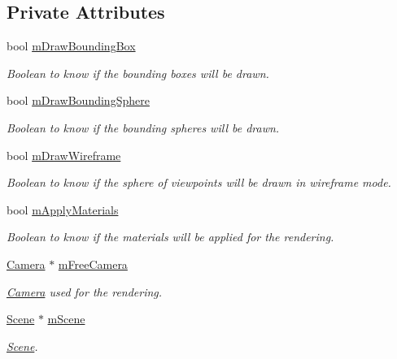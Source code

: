 \subsection*{Private Attributes}
\begin{DoxyCompactItemize}
\item 
bool \hyperlink{class_g_l_canvas_a29134dbb47d2929ec22466af3ff82fc6}{m\+Draw\+Bounding\+Box}
\begin{DoxyCompactList}\small\item\em Boolean to know if the bounding boxes will be drawn. \end{DoxyCompactList}\item 
bool \hyperlink{class_g_l_canvas_a8c5d1ccfff6a1d1d3d578b1f20414292}{m\+Draw\+Bounding\+Sphere}
\begin{DoxyCompactList}\small\item\em Boolean to know if the bounding spheres will be drawn. \end{DoxyCompactList}\item 
bool \hyperlink{class_g_l_canvas_adb8c8071a5e78417ff56355466992ca1}{m\+Draw\+Wireframe}
\begin{DoxyCompactList}\small\item\em Boolean to know if the sphere of viewpoints will be drawn in wireframe mode. \end{DoxyCompactList}\item 
bool \hyperlink{class_g_l_canvas_afee59d3997ff8cb4e05fb5a1244d5278}{m\+Apply\+Materials}
\begin{DoxyCompactList}\small\item\em Boolean to know if the materials will be applied for the rendering. \end{DoxyCompactList}\item 
\hyperlink{class_camera}{Camera} $\ast$ \hyperlink{class_g_l_canvas_a819693fdcfb9caccfa7b368edc3613c6}{m\+Free\+Camera}
\begin{DoxyCompactList}\small\item\em \hyperlink{class_camera}{Camera} used for the rendering. \end{DoxyCompactList}\item 
\hyperlink{class_scene}{Scene} $\ast$ \hyperlink{class_g_l_canvas_ad14c80647484e0ab65732ba971ed7b84}{m\+Scene}
\begin{DoxyCompactList}\small\item\em \hyperlink{class_scene}{Scene}. \end{DoxyCompactList}\item 

\end{DoxyCompactItemize}
